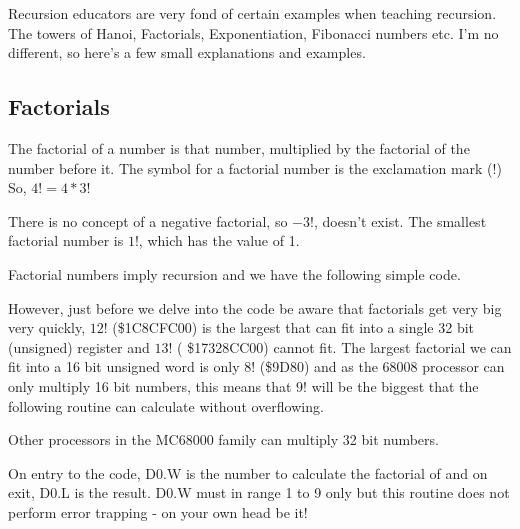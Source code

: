 Recursion educators are very fond of certain examples when teaching
    recursion. The towers of Hanoi, Factorials, Exponentiation, Fibonacci
    numbers etc. I'm no different, so here's a few small explanations and
    examples.

\subsection{Factorials}
\label{ch13-factorials}%

The factorial of a number is that number, multiplied by the
      factorial of the number before it. The symbol for a factorial number is the exclamation mark (!)  So, $4! = 4 * 3!$
      
      There is no concept of a negative factorial, so $-3!$, doesn't
      exist. The smallest factorial number is $1!$, which has the value of 1.

Factorial numbers imply recursion and we have the following simple
      code.

However, just before we delve into the code be aware that factorials get
      very big very quickly, $12!$ (\$1C8CFC00) is the largest that can fit into
      a single 32 bit (unsigned) register and $13!$ ( \$17328CC00) cannot fit.
      The largest factorial we can fit into a 16 bit unsigned word is only $8!$
      (\$9D80) and as the 68008 processor can only multiply 16 bit numbers,
      this means that $9!$ will be the biggest that the following routine can
      calculate without overflowing.

\begin{note}
Other processors in the MC68000 family can multiply 32 bit
        numbers.
\end{note}

On entry to the code, D0.W is the number to calculate the
      factorial of and on exit, D0.L is the result. D0.W must in range 1 to 9
      only but this routine does not perform error trapping -{} on your own head
      be it!

